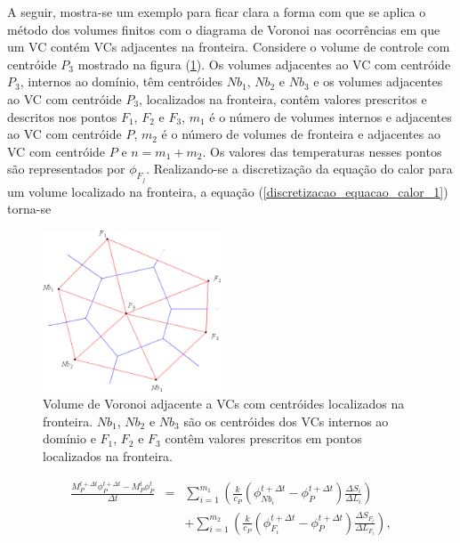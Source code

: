 A seguir, mostra-se um exemplo para ficar clara a forma com que se aplica o método dos volumes finitos com o diagrama de Voronoi nas ocorrências em que um VC contém VCs adjacentes na fronteira. Considere o volume de controle com  centróide $P_3$ mostrado na figura (\ref{fig_volume_voronoi_fronteira}). Os volumes adjacentes ao VC com centróide $P_3$, internos ao domínio, têm centróides $Nb_1$, $Nb_2$ e $Nb_3$ e os volumes  adjacentes ao VC com centróide $P_3$, localizados na fronteira, contêm valores prescritos e descritos nos pontos $F_1$, $F_2$ e $F_3$, $m_1$ é o número de volumes internos e adjacentes ao VC com centróide $P$, $m_2$ é o número de volumes de fronteira e adjacentes ao VC com centróide $P$ e $n = m_1 + m_2$.
Os valores das temperaturas nesses pontos são representados por $\phi_{F_{j}}$. Realizando-se a discretização da equação do calor para um volume localizado na fronteira, a equação (\ref{discretizacao_equacao_calor_1}) torna-se

\begin{figure}[!ht]
  \centering
  \includegraphics[width=150pt]{imagens_discretizacao/volume_voronoi_fronteira.png}
  \caption{\footnotesize{Volume de Voronoi adjacente a VCs com centróides localizados na fronteira. $Nb_1$, $Nb_2$ e $Nb_3$ são os centróides dos VCs internos ao domínio e $F_1$, $F_2$ e $F_3$ contêm valores prescritos em pontos localizados na fronteira.
}}
  \label{fig_volume_voronoi_fronteira}
\end{figure}


\begin{eqnarray}
 \frac { M_{P}^{t + \Delta t} \phi_P^{t + \Delta t} - M_{P}^{t} \phi_{P}^{t} } { \Delta t} &=& \sum_{i=1}^{m_1} \left( \frac {k} {c_P} \left( \phi_{Nb_{i}}^{t + \Delta t} - \phi_{P}^{t + \Delta t} \right) \frac {\Delta S_{i}} {\Delta L_{i}} \right) \nonumber \\
 & & + \sum_{i=1}^{m_2} \left( \frac {k} {c_P} \left( \phi_{F_{i}}^{t + \Delta t} - \phi_{P}^{t + \Delta t} \right) \frac {\Delta S_{F_{i}}} {\Delta L_{F_{i}}} \right), \nonumber
\end{eqnarray}

